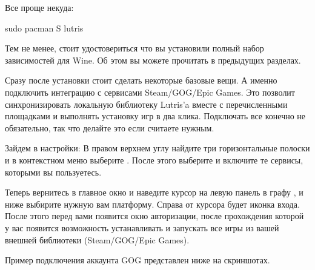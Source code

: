 \documentclass[letterpaper,10pt,russian,openany]{sphinxmanual}
\begin{document}
\sphinxAtStartPar
{}

\sphinxAtStartPar
Все проще некуда:

\begin{sphinxVerbatim}[commandchars=\\\{\}]
sudo pacman \PYGZhy{}S lutris
\end{sphinxVerbatim}

\sphinxAtStartPar
Тем не менее, стоит удостовериться что вы установили полный набор зависимостей для Wine. Об этом вы можете прочитать в предыдущих разделах.

\noindent{}

\sphinxAtStartPar
{}

\sphinxAtStartPar
Сразу после установки стоит сделать некоторые базовые вещи. А именно подключить интеграцию с сервисами Steam/GOG/Epic Games.
Это позволит синхронизировать локальную библиотеку Lutris'a вместе с перечисленными площадками и выполнять установку игр в два клика.
Подключать все конечно не обязательно, так что делайте это если считаете нужным.

\sphinxAtStartPar
{} Зайдем в настройки: В правом верхнем углу найдите три горизонтальные полоски и в контекстном меню выберите .
После этого выберите  и включите те сервисы, которыми вы пользуетесь.

\sphinxAtStartPar
{}

\noindent{}

\sphinxAtStartPar
{}

\noindent{}

\sphinxAtStartPar
{} Теперь вернитесь в главное окно и наведите курсор на левую панель в графу , и ниже выбирите нужную вам платформу.
Справа от курсора будет иконка входа. После этого перед вами появится окно авторизации, после прохождения которой у вас появится
возможность устанавливать и запускать все игры из вашей внешней библиотеки (Steam/GOG/Epic Games).

\sphinxAtStartPar
Пример подключения аккаунта GOG представлен ниже на скриншотах.

\sphinxAtStartPar
{}

\noindent{}
\end{document}

